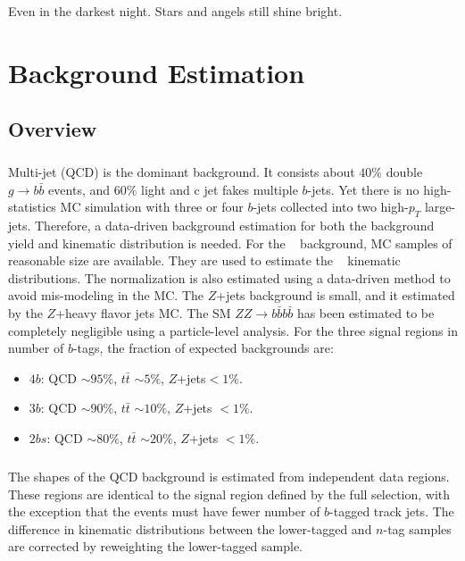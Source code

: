 \begin{savequote}[75mm]
Even in the darkest night. Stars and angels still shine bright.   
\end{savequote}


\chapter{Background Estimation}


\section{Overview}
\paragraph{}
Multi-jet (QCD) is the dominant background. 
It consists about $40\%$ double $g \to b\bar{b}$ events, and $60\%$ light and c jet fakes multiple $b$-jets.
Yet there is no high-statistics MC simulation with three or four $b$-jets collected into two high-$p_{T}$ large-\R jets.
Therefore, a data-driven background estimation for both the background yield and kinematic distribution is needed.
For the \ttbar~ background, MC samples of reasonable size are available. 
They are used to estimate the \ttbar~ kinematic distributions.
The normalization is also estimated using a data-driven method to avoid mis-modeling in the MC.
The $Z$+jets background is small, and it estimated by the $Z$+heavy flavor jets MC. 
The SM $ZZ\to b\bar{b}b\bar{b}$ has been estimated to be completely negligible using a particle-level analysis.
For the three signal regions in number of $b$-tags, the fraction of expected backgrounds are:
\begin{itemize}
	\item $4b$: QCD $\sim 95\%$, $t\bar{t}$ $\sim 5\%$, $Z$+jets$< 1\%$. 
	\item $3b$: QCD $\sim 90\%$, $t\bar{t}$ $\sim 10\%$, $Z$+jets $< 1\%$.  
	\item $2bs$: QCD $\sim 80\%$, $t\bar{t}$ $\sim 20\%$, $Z$+jets $< 1\%$.
\end{itemize}

\paragraph{}
The shapes of the QCD background is estimated from independent data regions. 
These regions are identical to the signal region defined by the full selection, with the exception that the events must have fewer number of $b$-tagged track jets.
The difference in kinematic distributions between the lower-tagged and $n$-tag samples are corrected by reweighting the lower-tagged sample.

